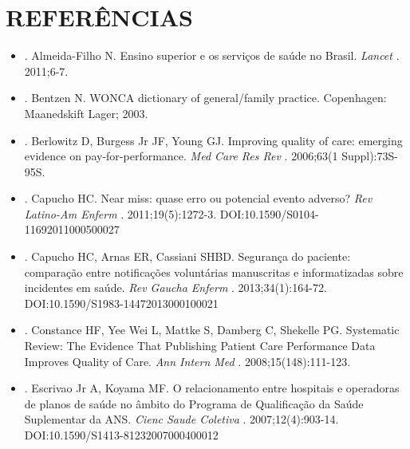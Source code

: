 \documentclass{article}
\begin{document}
\section*{%
REFERÊNCIAS}
\begin{itemize}

\item[%
1] %
. Almeida-Filho N. Ensino superior e os serviços de saúde no Brasil.
\textit{Lancet}
 . 2011;6-7.  

\item[%
2] %
. Bentzen N. WONCA dictionary of general/family practice. Copenhagen:
          Maanedskift Lager; 2003.  

\item[%
3] %
. Berlowitz D, Burgess Jr JF, Young GJ. Improving quality of care: emerging
          evidence on pay-for-performance. %
\textit{Med Care Res Rev}
 . 2006;63(1
          Suppl):73S-95S.  

\item[%
4] %
. Capucho HC. Near miss: quase erro ou potencial evento adverso? %
\textit{Rev
            Latino-Am Enferm}
 . 2011;19(5):1272-3.
          DOI:10.1590/S0104-11692011000500027  

\item[%
5] %
. Capucho HC, Arnas ER, Cassiani SHBD. Segurança do paciente: comparação
          entre notificações voluntárias manuscritas e informatizadas sobre incidentes em saúde.
\textit{Rev Gaucha Enferm}
 . 2013;34(1):164-72.
          DOI:10.1590/S1983-14472013000100021  

\item[%
6] %
. Constance HF, Yee Wei L, Mattke S, Damberg C, Shekelle PG. Systematic
          Review: The Evidence That Publishing Patient Care Performance Data Improves Quality of
          Care. %
\textit{Ann Intern Med}
 . 2008;15(148):111-123.  

\item[%
7] %
. Escrivao Jr A, Koyama MF. O relacionamento entre hospitais e operadoras de
          planos de saúde no âmbito do Programa de Qualificação da Saúde Suplementar da ANS.
\textit{Cienc Saude Coletiva}
 . 2007;12(4):903-14.
          DOI:10.1590/S1413-81232007000400012  


\end{itemize}
\end{document}
